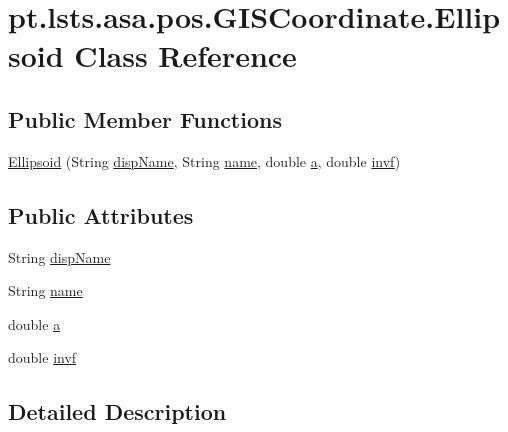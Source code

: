 \hypertarget{classpt_1_1lsts_1_1asa_1_1pos_1_1GISCoordinate_1_1Ellipsoid}{}\section{pt.\+lsts.\+asa.\+pos.\+G\+I\+S\+Coordinate.\+Ellipsoid Class Reference}
\label{classpt_1_1lsts_1_1asa_1_1pos_1_1GISCoordinate_1_1Ellipsoid}
\subsection*{Public Member Functions}
\begin{DoxyCompactItemize}
\item 
\hyperlink{classpt_1_1lsts_1_1asa_1_1pos_1_1GISCoordinate_1_1Ellipsoid_a32c80ec5a0a219670421887c4bba0b4d}{Ellipsoid} (String \hyperlink{classpt_1_1lsts_1_1asa_1_1pos_1_1GISCoordinate_1_1Ellipsoid_a9761003ee693f1303d7ce10babdfb21d}{disp\+Name}, String \hyperlink{classpt_1_1lsts_1_1asa_1_1pos_1_1GISCoordinate_1_1Ellipsoid_ae543a217d5f349088f023378690b139c}{name}, double \hyperlink{classpt_1_1lsts_1_1asa_1_1pos_1_1GISCoordinate_1_1Ellipsoid_aaaec46426b01cb056a3feb1ee32b54a6}{a}, double \hyperlink{classpt_1_1lsts_1_1asa_1_1pos_1_1GISCoordinate_1_1Ellipsoid_ad93c80547246333dbad9dcc44804a8f7}{invf})
\end{DoxyCompactItemize}
\subsection*{Public Attributes}
\begin{DoxyCompactItemize}
\item 
String \hyperlink{classpt_1_1lsts_1_1asa_1_1pos_1_1GISCoordinate_1_1Ellipsoid_a9761003ee693f1303d7ce10babdfb21d}{disp\+Name}
\item 
String \hyperlink{classpt_1_1lsts_1_1asa_1_1pos_1_1GISCoordinate_1_1Ellipsoid_ae543a217d5f349088f023378690b139c}{name}
\item 
double \hyperlink{classpt_1_1lsts_1_1asa_1_1pos_1_1GISCoordinate_1_1Ellipsoid_aaaec46426b01cb056a3feb1ee32b54a6}{a}
\item 
double \hyperlink{classpt_1_1lsts_1_1asa_1_1pos_1_1GISCoordinate_1_1Ellipsoid_ad93c80547246333dbad9dcc44804a8f7}{invf}
\end{DoxyCompactItemize}


\subsection{Detailed Description}


